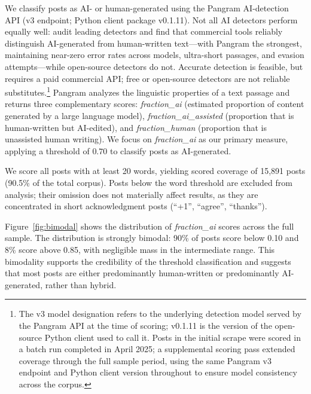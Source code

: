 \documentclass[12pt]{article}
\begin{document}
We classify posts as AI- or human-generated using the Pangram AI-detection API
(v3 endpoint; Python client package v0.1.11). Not all AI detectors perform
equally well: \citet{jabarian2025} audit leading detectors and find that commercial
tools reliably distinguish AI-generated from human-written text---with Pangram the
strongest, maintaining near-zero error rates across models, ultra-short passages, and
evasion attempts---while open-source detectors do not. Accurate detection is feasible,
but requires a paid commercial API; free or open-source detectors are not reliable
substitutes.\footnote{The v3 model designation
refers to the underlying detection model served by the Pangram API at the time
of scoring; v0.1.11 is the version of the open-source Python client used to
call it. Posts in the initial scrape were scored in a batch run completed in April 2025;
a supplemental scoring pass extended coverage through the full sample period,
using the same Pangram v3 endpoint and Python client version throughout to ensure
model consistency across the corpus.} Pangram analyzes the linguistic
properties of a text passage and returns three complementary scores:
\textit{fraction\_ai} (estimated proportion of content generated by a large
language model), \textit{fraction\_ai\_assisted} (proportion that is
human-written but AI-edited), and \textit{fraction\_human} (proportion that
is unassisted human writing). We focus on \textit{fraction\_ai} as our primary
measure, applying a threshold of $0.70$ to classify posts as AI-generated.

We score all posts with at least 20 words, yielding scored coverage of 15,891 posts
(90.5\% of the total corpus). Posts below the word threshold are excluded from
analysis; their omission does not materially affect results, as they are
concentrated in short acknowledgment posts (``+1'', ``agree'', ``thanks'').

Figure~\ref{fig:bimodal} shows the distribution of \textit{fraction\_ai}
scores across the full sample. The distribution is strongly bimodal: 90\% of
posts score below 0.10 and 8\% score above 0.85, with negligible
mass in the intermediate range. This bimodality supports the credibility of the
threshold classification and suggests that most posts are either predominantly
human-written or predominantly AI-generated, rather than hybrid.
\end{document}
